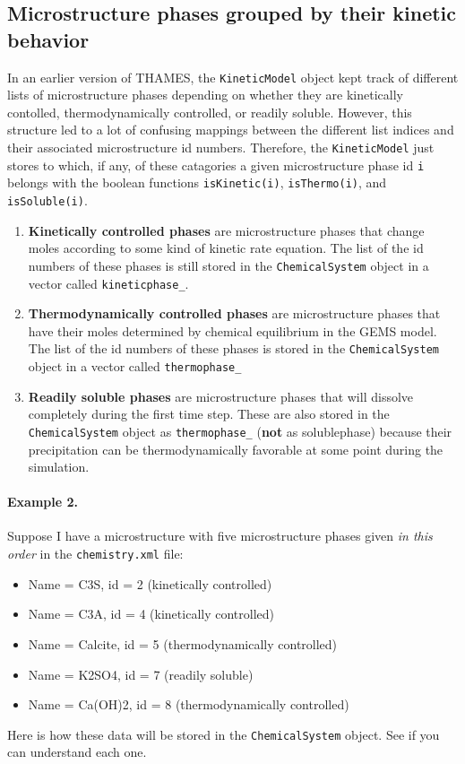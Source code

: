 \documentclass{article}
\begin{document}
\subsection{Microstructure phases grouped by their kinetic behavior}
In an earlier version of THAMES, the \verb!KineticModel! object kept
track of different lists of microstructure phases depending on whether
they are kinetically contolled, thermodynamically controlled, or readily
soluble.  However, this structure led to a lot of confusing mappings
between the different list indices and their associated microstructure id numbers.
Therefore, the \verb!KineticModel! just stores to which, if any, of
these catagories a given microstructure phase id \verb!i! belongs with
the boolean functions \verb!isKinetic(i)!, \verb!isThermo(i)!,
and \verb!isSoluble(i)!.
\begin{enumerate}
    \item \textbf{Kinetically controlled phases} are microstructure
        phases that change moles according to some kind of kinetic
        rate equation.  The list of the id numbers of these phases is still stored
        in the \verb!ChemicalSystem! object in a vector called \verb!kineticphase_!.
    \item \textbf{Thermodynamically controlled phases} are microstructure phases
        that have their moles determined by chemical equilibrium in the GEMS
        model. The list of
        the id numbers of these phases is stored in the \verb!ChemicalSystem!
        object in a vector called \verb!thermophase_!
    \item \textbf{Readily soluble phases} are microstructure phases that
        will dissolve completely during the first time step.  These are
        also stored in the \verb!ChemicalSystem! object as
        \verb!thermophase_! (\textbf{not} as solublephase) because their
        precipitation can be thermodynamically favorable at some point during
        the simulation.
\end{enumerate}

\paragraph{Example 2.}  Suppose I have a microstructure with five microstructure
phases given \textit{in this order} in the \verb!chemistry.xml! file:
\begin{itemize}
    \item Name = C3S, id = 2 (kinetically controlled)
    \item Name = C3A, id = 4 (kinetically controlled)
    \item Name = Calcite, id = 5 (thermodynamically controlled)
    \item Name = K2SO4, id = 7 (readily soluble)
    \item Name = Ca(OH)2, id = 8 (thermodynamically controlled)
\end{itemize}
Here is how these data will be stored in the \verb!ChemicalSystem! object.
See if you can understand each one.
\end{document}
